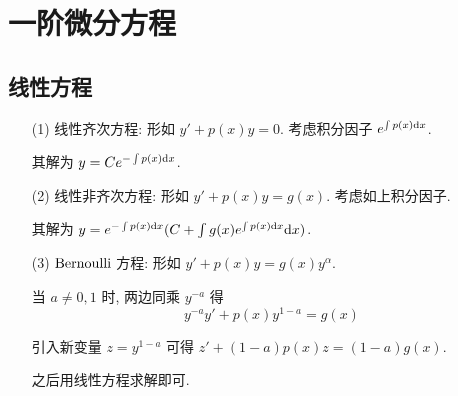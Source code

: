 
\newpage
\chapter{一阶微分方程}

\begin{theorem}[解的存在唯一性]\label{解的存在唯一性定理}
\end{theorem}

\section{线性方程}

\begin{itemize}[leftmargin=1.5cm]
	\item[(1)]线性齐次方程: 形如 $y'+p(x)y=0$. 考虑积分因子 $e^{\int p(x)\text {d} x}$. 
	
	其解为 $y=Ce^{-\int p(x)\text {d} x}$.
	
	\item[(2)] 线性非齐次方程: 形如 $y'+p(x)y=g(x)$. 考虑如上积分因子.
	
	其解为 $y=e^{-\int p(x)\text {d} x}(C+\int g(x)e^{\int p(x)\text {d} x} \text {d} x)$.
	
	\item[(3)]\label{Bernoulli} $\text {Bernoulli}$ 方程: 形如 $y'+p(x)y=g(x)y^{\alpha}$.
	
	当 $a\neq 0,1$ 时, 两边同乘 $y^{-a}$ 得
	$$y^{-a}y'+p(x)y^{1-a}=g(x)$$
	
	引入新变量 $z=y^{1-a}$ 可得 $z'+(1-a)p(x)z=(1-a)g(x)$.
	
	之后用线性方程求解即可.
\end{itemize}

